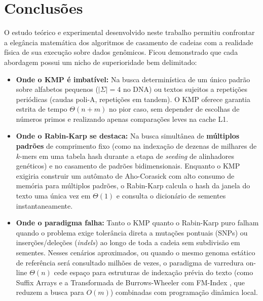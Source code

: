 \documentclass[12pt,a4paper]{article}
\begin{document}
\section{Conclus\~oes}

O estudo te\'orico e experimental desenvolvido neste trabalho permitiu confrontar a eleg\^ancia matem\'atica dos algoritmos de casamento de cadeias com a realidade f\'isica de sua execu\c{c}\~ao sobre dados gen\^omicos. Ficou demonstrado que cada abordagem possui um nicho de superioridade bem delimitado:

\begin{itemize}
    \item \textbf{Onde o KMP \'e imbat\'ivel:} Na busca determin\'istica de um \'unico padr\~ao sobre alfabetos pequenos ($|\Sigma|=4$ no DNA) ou textos sujeitos a repeti\c{c}\~oes peri\'odicas (caudas poli-A, repeti\c{c}\~oes em tandem). O KMP oferece garantia estrita de tempo $\Theta(n+m)$ no pior caso, sem depender de escolhas de n\'umeros primos e realizando apenas compara\c{c}\~oes leves na cache L1.
    \item \textbf{Onde o Rabin-Karp se destaca:} Na busca simult\^anea de \textbf{m\'ultiplos padr\~oes} de comprimento fixo (como na indexa\c{c}\~ao de dezenas de milhares de $k$-mers em uma tabela hash durante a etapa de \textit{seeding} de alinhadores gen\'eticos) e no casamento de padr\~oes bidimensionais. Enquanto o KMP exigiria construir um aut\^omato de Aho-Corasick com alto consumo de mem\'oria para múltiplos padrões, o Rabin-Karp calcula o hash da janela do texto uma \'unica vez em $\Theta(1)$ e consulta o dicion\'ario de sementes instantaneamente.
    \item \textbf{Onde o paradigma falha:} Tanto o KMP quanto o Rabin-Karp puro falham quando o problema exige toler\^ancia direta a muta\c{c}\~oes pontuais (SNPs) ou inser\c{c}\~oes/dele\c{c}\~oes (\textit{indels}) ao longo de toda a cadeia sem subdivis\~ao em sementes. Nesses cen\'arios aproximados, ou quando o mesmo genoma est\'atico de refer\^encia ser\'a consultado milh\~oes de vezes, o paradigma de varredura on-line $\Theta(n)$ cede espa\c{c}o para estruturas de indexa\c{c}\~ao pr\'evia do texto (como Suffix Arrays e a Transformada de Burrows-Wheeler com FM-Index \cite{li2009}, que reduzem a busca para $O(m)$) combinadas com programa\c{c}\~ao din\^amica local.
\end{itemize}
\end{document}
